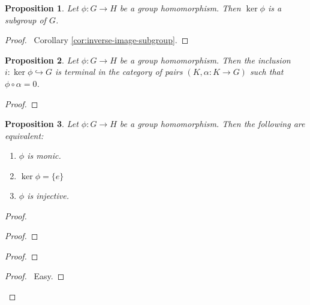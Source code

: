\documentclass{book}
\let\qed\relax
\newtheorem{prop}{Proposition}[chapter]
\theoremstyle{definition}
\newcommand{\inv}[1]{\ensuremath{{#1}^{-1}}}
\begin{document}
\begin{prop}
Let $\phi : G \rightarrow H$ be a group homomorphism. Then $\ker \phi$ is a subgroup of $G$.
\end{prop}

\begin{proof}
\pf\ Corollary \ref{cor:inverse-image-subgroup}. \qed
\end{proof}

\begin{prop}
Let $\phi : G \rightarrow H$ be a group homomorphism. Then the inclusion $i : \ker \phi \hookrightarrow G$ is terminal in the category of pairs $(K,\alpha : K \rightarrow G)$ such that $\phi \circ \alpha = 0$.
\end{prop}

\begin{proof}
\pf
{}
\qed
\end{proof}

\begin{prop}
\label{prop:ker-zero}
Let $\phi : G \rightarrow H$ be a group homomorphism. Then the following are equivalent:
\begin{enumerate}
\item $\phi$ is monic.
\item $\ker \phi = \{e\}$
\item $\phi$ is injective.
\end{enumerate}
\end{prop}

\begin{proof}
\pf
{}
\begin{proof}
\end{proof}
\begin{proof}
	\step{d}{$\phi(x\inv{y}) = e$}
	\step{e}{$x \inv{y} \in \ker \phi$}
	\step{f}{$x \inv{y} = e$}
\end{proof}
\begin{proof}
	\pf\ Easy.
\end{proof}
\qed
\end{proof}
\end{document}
